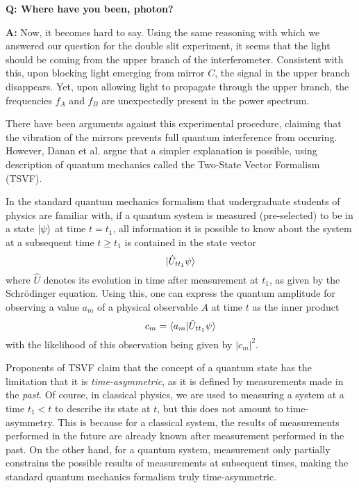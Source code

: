 \documentclass{article}
\newcommand{\Q}{\bfseries Q: }
\newcommand{\A}{\par\textbf{A:} \normalfont}
\begin{document}
\begin{framed}

	\Q Where have you been, photon?  

	\A Now, it becomes hard to say. Using the same reasoning with which we 
	answered our question for the double slit experiment, it seems that the 
	light should be coming from the upper branch of the interferometer.  
	Consistent with this, upon blocking light emerging from mirror $C$, the 
	signal in the upper branch disappears. Yet, upon allowing light to 
	propagate through the upper branch, the frequencies $f_A$ and $f_B$ are 
	unexpectedly present in the power spectrum.

\end{framed}

There have been arguments against this experimental procedure, claiming that 
the vibration of the mirrors prevents full quantum interference from occuring.  
However, Danan et al. argue that a simpler explanation is possible, using 
description of quantum mechanics called the Two-State Vector Formalism (TSVF). 

In the standard quantum mechanics formalism that undergraduate students of 
physics are familiar with, if a quantum system is measured (pre-selected) to be 
in a state $\ket \psi$ at time $t = t_1$, all information it is possible to 
know about the system at a subsequent time $t \geq t_1$ is contained in the 
state vector $$\ket{\hat U_{t t_1}\psi}$$ where $\hat U$ denotes its evolution 
in time after measurement at $t_1$, as given by the Schrödinger equation. Using 
this, one can express the quantum amplitude for observing a value $a_m$ of a 
physical observable $A$ at time $t$ as the inner product $$c_m = 
\braket{a_m|\hat U_{t t_1}\psi}$$ with the likelihood of this observation being 
given by ${|c_m|}^2$. 

Proponents of TSVF claim that the concept of a quantum state has the limitation 
that it is \textit{time-asymmetric}, as it is defined by measurements made in 
the \textit{past}.  Of course, in classical physics, we are used to measuring a 
system at a time $t_1 < t$ to describe its state at $t$, but this does not 
amount to time-asymmetry. This is because for a classical system, the results 
of measurements performed in the future are already known after measurement 
performed in the past. On the other hand, for a quantum system, measurement 
only partially constrains the possible results of measurements at subsequent 
times, making the standard quantum mechanics formalism truly time-asymmetric. 
\end{document}
